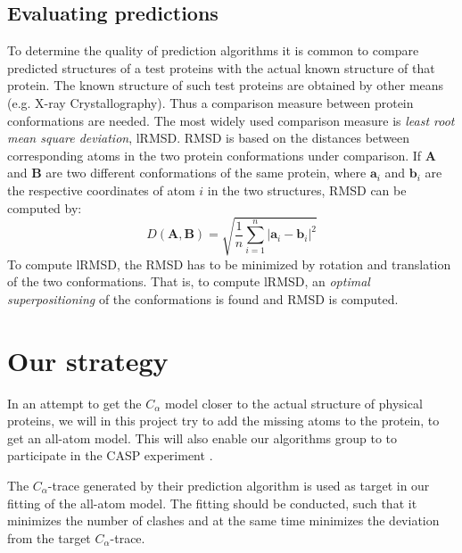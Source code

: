 \documentclass[10pt,a4paper,final,oneside,openany,article,twocolumn]{memoir}
\renewcommand\vec[1]{\boldsymbol{#1}}
\begin{document}

\subsection{Evaluating predictions}
To determine the quality of prediction algorithms it is common 
to compare predicted structures of a test proteins with the actual
known structure of that protein. The known structure of such test
proteins are obtained by other means (e.g. X-ray Crystallography).
Thus a comparison measure between protein conformations are
needed. The most widely used comparison measure is \textit{least root mean
  square deviation}, lRMSD. RMSD is based on the distances between
corresponding atoms in the two protein conformations under comparison.
If $\vec{A}$ and $\vec{B}$ are two different conformations of the same protein,
where $\vec{a}_i$ and $\vec{b}_i$ are the respective coordinates of atom $i$ in the two
structures, RMSD can be computed by:
\begin{equation}
  \label{eq:rmsd}
  D(\vec{A}, \vec{B}) = \sqrt{\frac{1}{n}\sum_{i=1}^n |\vec{a}_i - \vec{b}_i|^2}
\end{equation}
To compute lRMSD, the RMSD has to be minimized by rotation and
translation of the two conformations. That is, to compute lRMSD, an
\textit{optimal superpositioning} of the conformations is found and
RMSD is computed.





\section{Our strategy}
In an attempt to get the $C_\alpha$ model closer to the actual
structure of physical proteins, we will in this project try to add the
missing atoms to the protein, to get an all-atom model.  This will
also enable our algorithms group to to participate in the CASP
experiment \cite{caspwebsite}.

The $C_\alpha$-trace generated by their prediction algorithm is used
as target in our fitting of the all-atom model. The fitting should be
conducted, such that it minimizes the number of clashes and at the
same time minimizes the deviation from the target $C_\alpha$-trace.
\end{document}
